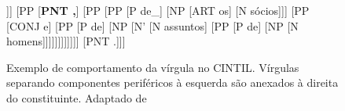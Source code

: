 \begin{figure}[!h]
    \centering
    \begin{forest}
		[S [PNT '] [S [S [VP [V Falámos] [PP [PP [P de] [NP [N caça]]] [PP [\textbf{PNT ,}] [PP [PP [P de\_] [NP [ART os] [N sócios]]] [PP [CONJ e] [PP [P de] [NP [N' [N assuntos] [PP [P de] [NP [N homens]]]]]]]]]]]] [PNT .]]]
    \end{forest}
    \caption[Exemplo de comportamento da vírgula no CINTIL]{Exemplo de comportamento da vírgula no CINTIL. Vírgulas separando componentes periféricos à esquerda são anexados à direita do constituinte. Adaptado de }
    \label{fig:cintil_comma_left}
\end{figure}